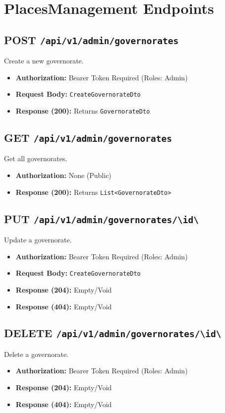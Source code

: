\section{PlacesManagement Endpoints}

\subsection{POST \texttt{/api/v1/admin/governorates}}
Create a new governorate.
\begin{itemize}
    \item \textbf{Authorization:} Bearer Token Required (Roles: Admin)
    \item \textbf{Request Body:} \texttt{CreateGovernorateDto}
    \item \textbf{Response (200):} Returns \texttt{GovernorateDto}
\end{itemize}

\subsection{GET \texttt{/api/v1/admin/governorates}}
Get all governorates.
\begin{itemize}
    \item \textbf{Authorization:} None (Public)
    \item \textbf{Response (200):} Returns \texttt{List<GovernorateDto>}
\end{itemize}

\subsection{PUT \texttt{/api/v1/admin/governorates/\textbackslash{}{id\textbackslash{}}}}
Update a governorate.
\begin{itemize}
    \item \textbf{Authorization:} Bearer Token Required (Roles: Admin)
    \item \textbf{Request Body:} \texttt{CreateGovernorateDto}
    \item \textbf{Response (204):} Empty/Void
    \item \textbf{Response (404):} Empty/Void
\end{itemize}

\subsection{DELETE \texttt{/api/v1/admin/governorates/\textbackslash{}{id\textbackslash{}}}}
Delete a governorate.
\begin{itemize}
    \item \textbf{Authorization:} Bearer Token Required (Roles: Admin)
    \item \textbf{Response (204):} Empty/Void
    \item \textbf{Response (404):} Empty/Void
\end{itemize}

